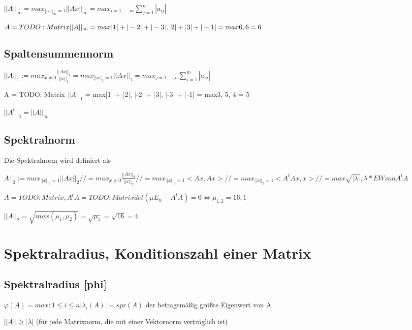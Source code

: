 \documentclass[12pt,a4paper]{article} %
\begin{document}
	$||A||_\infty = max_{||x||_\infty = 1} ||Ax||_\infty = max_{i = 1, ..., m} \sum_{j = 1}^{n} |a_{ij}|$
	
	$A = TODO: Matrix  ||A||_\infty \\
	= max{|1| + |-2| + |-3|, |2| + |3| + |-1|} \\
	= max{6, 6} = 6$
	
	\subsection{Spaltensummennorm}
	
	$||A||_1 := max_{x \ne 0} \frac{||Ax||_1}{||x||_1} = max_{||x||_1 = 1} ||Ax||_1 = max_{j = 1, ..., n} \sum_{i = 1}^{m}|a_{ij}|$
	
	A = TODO: Matrix  $||A||_1$ = max{|1| + |2|, |-2| + |3|, |-3| + |-1|} = max{3, 5, 4} = 5
	
	$||A^t||_1 = ||A||_\infty$
	
	\subsection{Spektralnorm}
	
	Die Spektralnorm wird definiert als
	
	$A||_2 := max_{||x||_2 = 1} ||Ax||_2 //
	= max_{x \ne 0} \frac{||Ax||_2}{||x||_2} //
	= max_{||x||_2 = 1} <Ax, Ax> //
	= max_{||x||_2 = 1} <A^tAx, x> //
	= max{\sqrt{|\lambda |}, \lambda * EW von A^tA}$
	
	$A = TODO: Matrix  , A^tA = TODO: Matrix    det(\mu E_n - A^tA) = 0 \Leftrightarrow \mu_{1, 2} = {16, 1}$
	
	$||A||_2 = \sqrt{max(\mu_1, \mu_2)} = \sqrt{\mu_1} = \sqrt{16} = 4$
	
	\newpage
	
	\section{Spektralradius, Konditionszahl einer Matrix}
	
	\subsection{Spektralradius [phi]}
	
	$\varphi(A) = max:{1 \le i \le n} |\lambda_i(A)| = spr(A)$ der betragsmäßig größte Eigenwert von A
	
	$||A|| \ge |\lambda|$ (für jede Matrixnorm, die mit einer Vektornorm verträglich ist)
	
\end{document}
